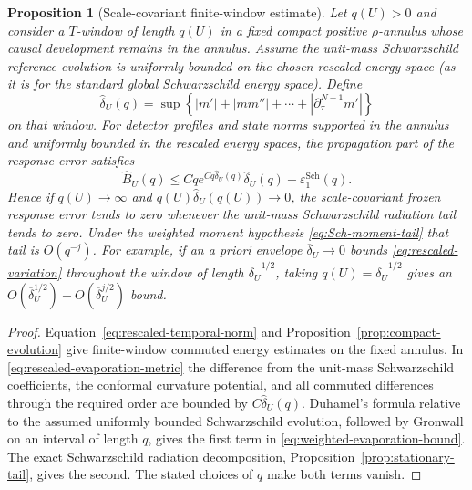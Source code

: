 \documentclass[11pt,a4paper]{article}
\newtheorem{proposition}[theorem]{Proposition}
\theoremstyle{definition}
\theoremstyle{remark}
\begin{document}
	\begin{proposition}[Scale-covariant finite-window estimate]
		\label{prop:scaled-window}
		Let $q(U)>0$ and consider a $T$-window of length $q(U)$ in a fixed compact
		positive $\rho$-annulus whose causal development remains in the annulus.
		Assume the unit-mass Schwarzschild reference evolution is uniformly bounded
		on the chosen rescaled energy space (as it is for the standard global
		Schwarzschild energy space).  Define
		\begin{equation}
			\widehat\delta_U(q)=
			\sup\left\{|m'|+|mm''|+\cdots+|\partial_\tau^{N-1}m'|\right\}
			\label{eq:rescaled-variation}
		\end{equation}
		on that window.  For detector profiles and state norms supported in the
		annulus and uniformly bounded in the rescaled energy spaces, the
		propagation part of the response error satisfies
		\begin{equation}
			\widehat B_U(q)
			\leq Cq e^{Cq\widehat\delta_U(q)}\widehat\delta_U(q)
			+\varepsilon^{\mathrm{Sch}}_{1}(q).
			\label{eq:weighted-evaporation-bound}
		\end{equation}
		Hence if $q(U)\to\infty$ and
		$q(U)\widehat\delta_U(q(U))\to0$, the scale-covariant frozen response error
		tends to zero whenever the unit-mass Schwarzschild radiation tail tends to
		zero.  Under the weighted moment hypothesis \eqref{eq:Sch-moment-tail} that
		tail is $O(q^{-j})$.  For example, if an a priori envelope
		$\overline\delta_U\to0$ bounds \eqref{eq:rescaled-variation} throughout the
		window of length $\overline\delta_U^{-1/2}$, taking
		$q(U)=\overline\delta_U^{-1/2}$ gives an
		$O(\overline\delta_U^{1/2})+O(\overline\delta_U^{j/2})$ bound.
	\end{proposition}
	
	\begin{proof}
		Equation~\eqref{eq:rescaled-temporal-norm} and
		Proposition~\ref{prop:compact-evolution} give finite-window commuted energy
		estimates on the fixed annulus.  In \eqref{eq:rescaled-evaporation-metric} the difference
		from the unit-mass Schwarzschild coefficients, the conformal curvature
		potential, and all commuted differences through the required order are
		bounded by $C\widehat\delta_U(q)$.  Duhamel's formula relative to the assumed
		uniformly bounded Schwarzschild evolution, followed by Gronwall on an
		interval of length $q$, gives the first term in
		\eqref{eq:weighted-evaporation-bound}.  The exact
		Schwarzschild radiation decomposition, Proposition~\ref{prop:stationary-tail},
		gives the second.  The stated choices of $q$ make both terms vanish.
	\end{proof}
	
\end{document}
